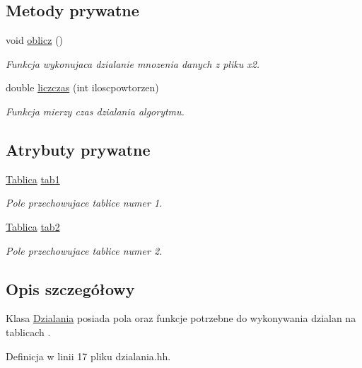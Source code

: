 \subsection*{Metody prywatne}
\begin{DoxyCompactItemize}
\item 
void \hyperlink{class_dzialania_a5e82b0cea1d28ce02b6968071c1d20e5}{oblicz} ()
\begin{DoxyCompactList}\small\item\em Funkcja wykonujaca dzialanie mnozenia danych z pliku x2. \end{DoxyCompactList}\item 
double \hyperlink{class_dzialania_a8c13fb89281d74f9dd8dd22f43bffbb9}{liczczas} (int iloscpowtorzen)
\begin{DoxyCompactList}\small\item\em Funkcja mierzy czas dzialania algorytmu. \end{DoxyCompactList}\end{DoxyCompactItemize}
\subsection*{Atrybuty prywatne}
\begin{DoxyCompactItemize}
\item 
\hyperlink{class_tablica}{Tablica} \hyperlink{class_dzialania_aa1cf12383b1e7fe159856ff7a29216fc}{tab1}
\begin{DoxyCompactList}\small\item\em Pole przechowujace tablice numer 1. \end{DoxyCompactList}\item 
\hyperlink{class_tablica}{Tablica} \hyperlink{class_dzialania_a63fcc04c8e704850ceec908ed61b408a}{tab2}
\begin{DoxyCompactList}\small\item\em Pole przechowujace tablice numer 2. \end{DoxyCompactList}\end{DoxyCompactItemize}


\subsection{Opis szczegółowy}
Klasa \hyperlink{class_dzialania}{Dzialania} posiada pola oraz funkcje potrzebne do wykonywania dzialan na tablicach . 

Definicja w linii 17 pliku dzialania.\-hh.



